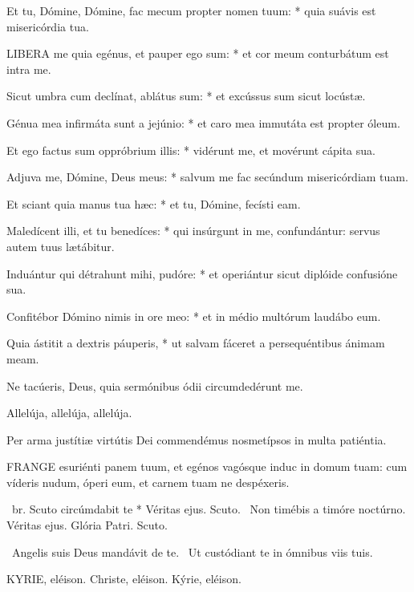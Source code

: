 Et tu, Dómine, Dómine, fac mecum propter nomen tuum: * quia suávis est misericórdia tua.


\lettrine[lines=2]{L}{IBERA} me quia egénus, et pauper ego sum: * et cor meum conturbátum est intra me.

Sicut umbra cum declínat, ablátus sum: * et excússus sum sicut locústæ.

Génua mea infirmáta sunt a jejúnio: * et caro mea immutáta est propter óleum.

Et ego factus sum oppróbrium illis: * vidérunt me, et movérunt cápita sua.

Adjuva me, Dómine, Deus meus: * salvum me fac secúndum misericórdiam tuam.

Et sciant quia manus tua hæc: * et tu, Dómine, fecísti eam.

Maledícent illi, et tu benedíces: * qui insúrgunt in me, confundántur: servus autem tuus lætábitur.

Induántur qui détrahunt mihi, pudóre: * et operiántur sicut diplóide confusióne sua.

Confitébor Dómino nimis in ore meo: * et in médio multórum laudábo eum.

Quia ástitit a dextris páuperis, * ut salvam fáceret a persequéntibus ánimam meam.

  Ne tacúeris, Deus, quia sermónibus ódii circumdedérunt me.

  Allelúja, allelúja, allelúja.



 Per arma justítiæ virtútis Dei commendémus nosmetípsos in multa patiéntia.


\lettrine[lines=2]{F}{RANGE} esuriénti panem tuum, et egénos vagósque induc in domum tuam: cum víderis nudum, óperi eum, et carnem tuam ne despéxeris.

\R\ br. Scuto circúmdabit te * Véritas ejus. Scuto. \V\ Non timébis a timóre noctúrno. Véritas ejus. Glória Patri. Scuto.

\V\ Angelis suis Deus mandávit de te. \R\ Ut custódiant te in ómnibus viis tuis.


KYRIE, eléison. Christe, eléison. Kýrie, eléison.

